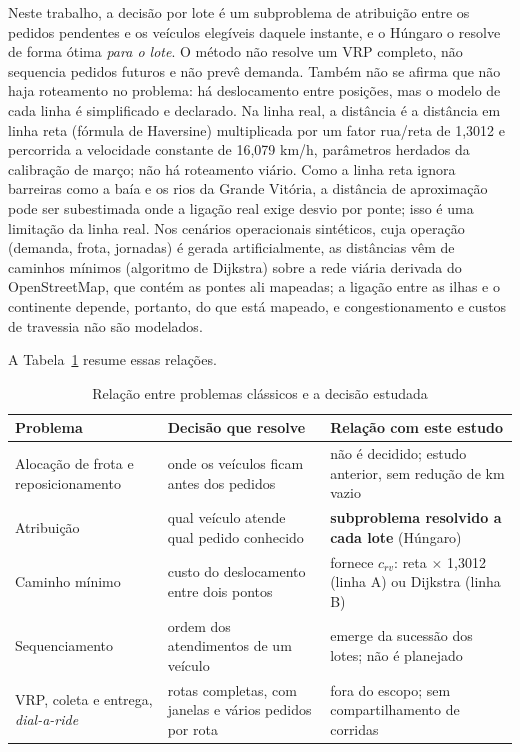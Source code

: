 Neste trabalho, a decisão por lote é um subproblema de atribuição entre os pedidos pendentes e os veículos elegíveis daquele instante, e o Húngaro o resolve de forma ótima \emph{para o lote}. O método não resolve um VRP completo, não sequencia pedidos futuros e não prevê demanda. Também não se afirma que não haja roteamento no problema: há deslocamento entre posições, mas o modelo de cada linha é simplificado e declarado. Na linha real, a distância é a distância em linha reta (fórmula de Haversine) multiplicada por um fator rua/reta de 1,3012 e percorrida a velocidade constante de 16,079 km/h, parâmetros herdados da calibração de março; não há roteamento viário. Como a linha reta ignora barreiras como a baía e os rios da Grande Vitória, a distância de aproximação pode ser subestimada onde a ligação real exige desvio por ponte; isso é uma limitação da linha real. Nos cenários operacionais sintéticos, cuja operação (demanda, frota, jornadas) é gerada artificialmente, as distâncias vêm de caminhos mínimos (algoritmo de Dijkstra) sobre a rede viária derivada do OpenStreetMap, que contém as pontes ali mapeadas; a ligação entre as ilhas e o continente depende, portanto, do que está mapeado, e congestionamento e custos de travessia não são modelados.

A Tabela~\ref{tab:problemas} resume essas relações.

\begin{table}[!htb]
\caption{Relação entre problemas clássicos e a decisão estudada}\label{tab:problemas}
\centering\fontetabela
\begin{tabular}{@{}p{30mm}p{58mm}p{60mm}@{}}
\toprule
Problema & Decisão que resolve & Relação com este estudo \\
\midrule
Alocação de frota e reposicionamento & onde os veículos ficam antes dos pedidos & não é decidido; estudo anterior, sem redução de km vazio \\
Atribuição & qual veículo atende qual pedido conhecido & \textbf{subproblema resolvido a cada lote} (Húngaro) \\
Caminho mínimo & custo do deslocamento entre dois pontos & fornece $c_{rv}$: reta $\times$ 1,3012 (linha A) ou Dijkstra (linha B) \\
Sequenciamento & ordem dos atendimentos de um veículo & emerge da sucessão dos lotes; não é planejado \\
VRP, coleta e entrega, \textit{dial-a-ride} & rotas completas, com janelas e vários pedidos por rota & fora do escopo; sem compartilhamento de corridas \\
\bottomrule
\end{tabular}
\end{table}

